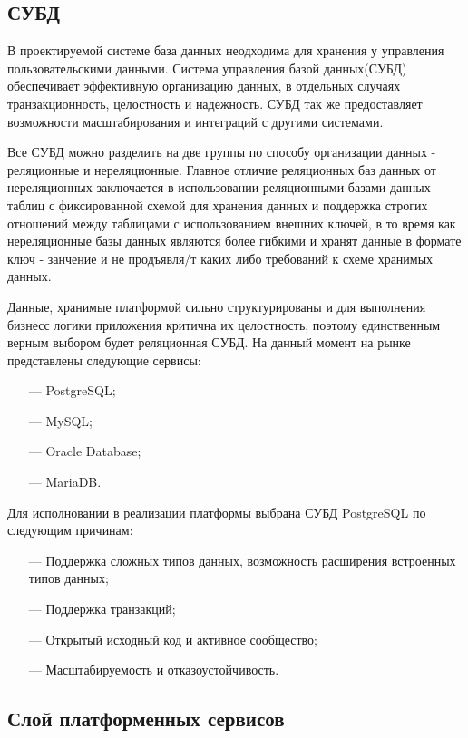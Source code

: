 \subsection{СУБД}

В проектируемой системе база данных неодходима для хранения у управления пользовательскими данными. Система управления базой данных(СУБД) обеспечивает эффективную организацию данных, в отдельных случаях транзакционность, целостность и надежность. СУБД так же предоставляет возможности масштабирования и интеграций с другими системами.

Все СУБД можно разделить на две группы по способу организации данных - реляционные и нереляционные. Главное отличие реляционных баз данных от нереляционных заключается в использовании реляционными базами данных таблиц с фиксированной схемой для хранения данных и поддержка строгих отношений между таблицами с использованием внешних ключей, в то время как нереляционные базы данных являются более гибкими и хранят данные в формате ключ - занчение и не продъявля/т каких либо требований к схеме хранимых данных.

Данные, хранимые платформой сильно структурированы и для выполнения бизнесс логики приложения критична их целостность, поэтому единственным верным выбором будет реляционная СУБД. На данный момент на рынке представлены следующие сервисы:

\begin{itemize}
  \item[---] PostgreSQL;
  \item[---] MySQL;
  \item[---] Oracle Database;
  \item[---] MariaDB.
\end{itemize}

Для исполновании в реализации платформы выбрана СУБД PostgreSQL по следующим причинам:

\begin{itemize}
  \item[---] Поддержка сложных типов данных, возможность расширения встроенных типов данных;
  \item[---] Поддержка транзакций;
  \item[---] Открытый исходный код и активное сообщество;
  \item[---] Масштабируемость и отказоустойчивость.
\end{itemize}

\subsection{Слой платформенных сервисов}

